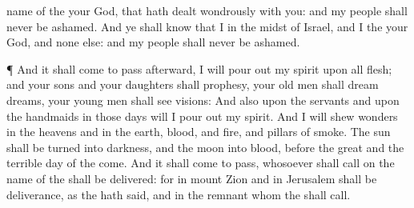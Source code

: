 {name of the
{} your
God, that hath
dealt
wondrously with you: and my
people shall
never be
ashamed.
And ye shall
know that I
{} in the
midst of
Israel, and
{} I
{} the
{} your
God, and none else: and my
people shall
never be
ashamed.
\par }{\PP {}¶ And it shall come to pass
afterward,
{} I will pour
out my
spirit upon all
flesh; and your
sons and your
daughters shall
prophesy, your old
men shall
dream
dreams, your young
men shall
see
visions:
And also upon the
servants and upon the
handmaids in those
days will I pour
out my
spirit.
And I will
shew
wonders in the
heavens and in the
earth,
blood, and
fire, and
pillars of
smoke.
The
sun shall be
turned into
darkness, and the
moon into
blood,
before the
great and the
terrible
day of the
{}
come.
And it shall come to pass,
{} whosoever shall
call on the
name of the
{} shall be
delivered: for in
mount
Zion and in
Jerusalem shall be
deliverance, as the
{} hath
said, and in the
remnant whom the
{} shall
call.

}
